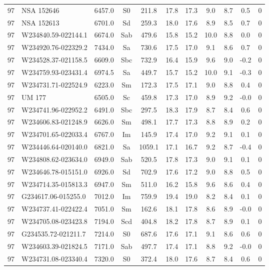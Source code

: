 {\begin{longtable}{clccccccccc}
 97 & NSA 152646 & 6457.0 & S0 & 211.8 & 17.8 & 17.3 & 9.0 & 8.7 & 0.5 & 0 \\ 
 97 & NSA 152613 & 6701.0 & Sd & 259.3 & 18.0 & 17.6 & 8.9 & 8.5 & 0.7 & 0 \\ 
 97 & W234840.59-022144.1 & 6674.0 & Sab & 479.6 & 15.8 & 15.2 & 10.0 & 8.8 & 0.0 & 0 \\ 
 97 & W234920.76-022329.2 & 7434.0 & Sa & 730.6 & 17.5 & 17.0 & 9.1 & 8.6 & 0.7 & 0 \\ 
 97 & W234528.37-021158.5 & 6609.0 & Sbc & 732.9 & 16.4 & 15.9 & 9.6 & 9.0 & -0.2 & 0 \\ 
 97 & W234759.93-023431.4 & 6974.5 & Sa & 449.7 & 15.7 & 15.2 & 10.0 & 9.1 & -0.3 & 0 \\ 
 97 & W234731.71-022524.9 & 6223.0 & Sm & 172.3 & 17.5 & 17.1 & 9.0 & 8.8 & 0.4 & 0 \\ 
 97 & UM 177 & 6505.0 & Sc & 459.8 & 17.3 & 17.0 & 8.9 & 9.2 & -0.0 & 0 \\ 
 97 & W234741.96-022952.2 & 6491.0 & Sbc & 297.5 & 18.3 & 17.9 & 8.7 & 8.4 & 0.6 & 0 \\ 
 97 & W234606.83-021248.9 & 6626.0 & Sm & 498.1 & 17.7 & 17.3 & 8.8 & 8.9 & 0.2 & 0 \\ 
 97 & W234701.65-022033.4 & 6767.0 & Im & 145.9 & 17.4 & 17.0 & 9.2 & 9.1 & 0.1 & 0 \\ 
 97 & W234446.64-020140.0 & 6821.0 & Sa & 1059.1 & 17.1 & 16.7 & 9.2 & 8.7 & -0.4 & 0 \\ 
 97 & W234808.62-023634.0 & 6949.0 & Sab & 520.5 & 17.8 & 17.3 & 9.0 & 9.1 & 0.1 & 0 \\ 
 97 & W234646.78-015151.0 & 6926.0 & Sd & 702.9 & 17.6 & 17.2 & 9.0 & 8.8 & 0.5 & 0 \\ 
 97 & W234714.35-015813.3 & 6947.0 & Sm & 511.0 & 16.2 & 15.8 & 9.6 & 8.6 & 0.4 & 0 \\ 
 97 & G234617.06-015255.0 & 7012.0 & Im & 759.9 & 19.4 & 19.0 & 8.2 & 8.4 & 0.1 & 0 \\ 
 97 & W234737.41-022422.4 & 7051.0 & Sm & 162.6 & 18.1 & 17.8 & 8.6 & 8.9 & -0.0 & 0 \\ 
 97 & W234705.08-023423.8 & 7194.0 & Scd & 404.8 & 18.2 & 17.8 & 8.7 & 8.9 & 0.1 & 0 \\ 
 97 & G234535.72-021211.7 & 7214.0 & S0 & 687.6 & 17.6 & 17.1 & 9.1 & 8.6 & 0.6 & 0 \\ 
 97 & W234603.39-021824.5 & 7171.0 & Sab & 497.7 & 17.4 & 17.1 & 8.8 & 9.2 & -0.0 & 0 \\ 
 97 & W234731.08-023340.4 & 7320.0 & S0 & 372.4 & 18.0 & 17.6 & 8.7 & 8.4 & 0.6 & 0 \\ 

\end{longtable}}

